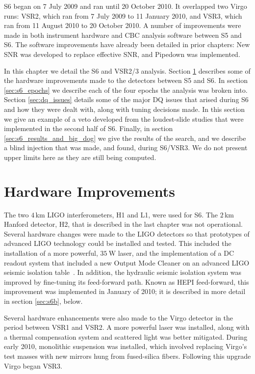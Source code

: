 
\ac{S6} began on 7 July 2009 and ran until 20 October 2010. It overlapped two Virgo runs: \ac{VSR2}, which ran from 7 July 2009 to 11 January 2010, and \ac{VSR3}, which ran from 11 August 2010 to 20 October 2010. A number of improvements were made in both instrument hardware and \ac{CBC} analysis software between \ac{S5} and \ac{S6}. The software improvements have already been detailed in prior chapters: New \ac{SNR} was developed to replace effective \ac{SNR}, and Pipedown was implemented.

In this chapter we detail the \ac{S6} and VSR2/3 analysis. Section \ref{sec:hardware_improvements} describes some of the hardware improvements made to the detectors between \ac{S5} and \ac{S6}. In section \ref{sec:s6_epochs} we describe each of the four epochs the analysis was broken into. Section \ref{sec:dq_issues} details some of the major \ac{DQ} issues that arised during \ac{S6} and how they were dealt with, along with tuning decisions made. In this section we give an example of a veto developed from the loudest-slide studies that were implemented in the second half of \ac{S6}. Finally, in section \ref{sec:s6_results_and_big_dog} we give the results of the search, and we describe a blind injection that was made, and found, during \ac{S6}/VSR3. We do not present upper limits here as they are still being computed.

\section{Hardware Improvements}
\label{sec:hardware_improvements}

The two $4\,$km \ac{LIGO} interferometers, H1 and L1, were used for \ac{S6}.
The $2\,$km Hanford detector, H2, that is described in the last chapter was not
operational. Several hardware changes were made to the \ac{LIGO} detectors so
that prototypes of advanced LIGO technology could be installed and tested. This
included the installation of a more powerful, $35~\mathrm{W}$ laser, and the
implementation of a DC readout system that included a new Output Mode Cleaner
on an advanced LIGO seismic isolation table~\cite{Adhikari:2006}. In addition,
the hydraulic seismic isolation system was improved by fine-tuning its
feed-forward path. Known as HEPI feed-forward, this improvement was implemented
in January of 2010; it is described in more detail in section \ref{sec:s6b},
below.

Several hardware enhancements were also made to the Virgo detector in the
period between \ac{VSR1} and \ac{VSR2}. A more powerful laser was installed,
along with a thermal compensation system and scattered light was better
mitigated. During early 2010, monolithic suspension was installed, which
involved replacing Virgo's test masses with new mirrors hung from fused-silica
fibers. Following this upgrade Virgo began \ac{VSR3}. 

